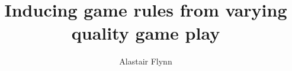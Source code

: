 \documentclass[a4paper,10pt]{report}
\begin{document}
\title{\Large{\textbf{Inducing game rules from varying quality game play}}}
\author{Alastair Flynn}
\maketitle

\tableofcontents












\end{document}
